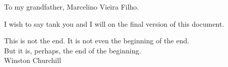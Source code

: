 \begin{dedicatoria}
  To my grandfather, Marcelino Vieira Filho.
\end{dedicatoria}

\begin{agradecimentos}
    I wish to say tank you and I will on the final version of this document.
\end{agradecimentos}

\begin{epigrafe}
  This is not the end. It is not even the beginning of the end.\\But it is, perhaps, the end of the beginning.\\Winston Churchill
\end{epigrafe}
